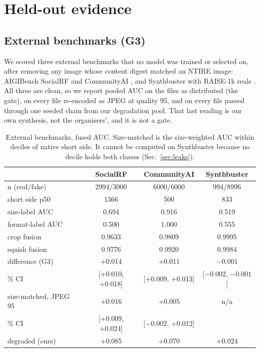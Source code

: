 \documentclass[letterpaper]{article} %
\begin{document}
\section{Held-out evidence}
\label{sec:heldout}

\subsection{External benchmarks (G3)}

We scored three external benchmarks that no model was trained or selected on,
after removing any image whose content digest matched an NTIRE image:
AIGIBench SocialRF and CommunityAI \cite{li2025aigibench}, and Synthbuster
with RAISE-1k reals \cite{bammey2024synthbuster,dangnguyen2015raise}. All three
are clean, so we report pooled AUC on the files as distributed (the gate), on
every file re-encoded as JPEG at quality 95, and on every file passed through
one seeded chain from our degradation pool. That last reading is our own
synthesis, not the organisers', and it is not a gate.

\begin{table}[t]
\centering
\small
\begin{tabular}{lccc}
\toprule
 & SocialRF & CommunityAI & Synthbuster \\
\midrule
n (real/fake) & 2994/3000 & 6000/6000 & 994/8996 \\
short side p50 & 1366 & 500 & 833 \\
size-label AUC & 0.694 & 0.916 & 0.519 \\
format-label AUC & 0.500 & 1.000 & 0.555 \\
\midrule
crop fusion & 0.9633 & 0.9809 & 0.9995 \\
squish fusion & 0.9776 & 0.9920 & 0.9984 \\
difference (G3) & +0.014 & +0.011 & $-0.001$ \\
\quad 95\% CI & [+0.010, +0.018] & [+0.009, +0.013] & [$-0.002$, $-0.001$] \\
\midrule
size-matched, JPEG 95 & +0.016 & +0.005 & n/a \\
\quad 95\% CI & [+0.009, +0.024] & [$-0.002$, +0.012] & \\
degraded (ours) & +0.085 & +0.070 & +0.024 \\
\bottomrule
\end{tabular}
\caption{External benchmarks, fused AUC. Size-matched is the size-weighted AUC
within deciles of native short side. It cannot be computed on Synthbuster
because no decile holds both classes (Sec.~\ref{sec:leaks}).}
\label{tab:external}
\end{table}
\end{document}
